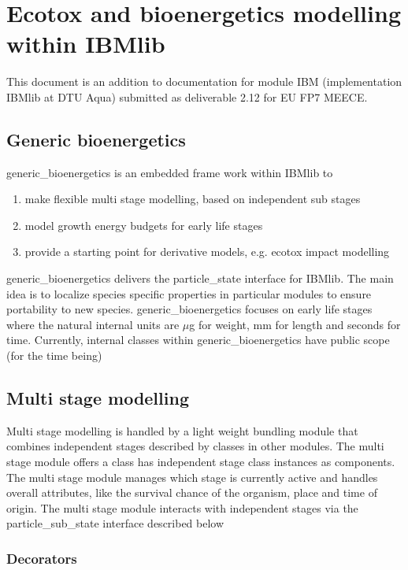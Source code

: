

\section{Ecotox and bioenergetics modelling within IBMlib} 

This document is an addition to documentation for module IBM (implementation IBMlib at DTU Aqua)
submitted as deliverable 2.12 for EU FP7 MEECE. 

\subsection{Generic bioenergetics} 

generic\_bioenergetics is an embedded frame work within IBMlib to 
\begin{enumerate}
  \item make flexible multi stage modelling, based on independent sub stages
  \item model growth energy budgets for early life stages
  \item provide a starting point for derivative models, e.g. ecotox impact modelling
\end{enumerate} 
generic\_bioenergetics delivers the particle\_state interface for IBMlib.
The main idea is to localize species specific properties in particular modules
to ensure portability to new species.
generic\_bioenergetics focuses on early life stages where the natural internal units 
are $\mu$g for weight, mm for length and seconds for time.
Currently, internal classes within generic\_bioenergetics have public scope (for the time being)

\subsection{Multi stage modelling} 

Multi stage modelling is handled by a light weight bundling module that 
combines independent stages described by classes in other modules. The multi stage module
offers a class has independent stage class instances as components. The multi stage module
manages which stage is currently active and handles overall attributes, like the survival chance
of the organism, place and time of origin. The multi stage module interacts with independent stages
via the particle\_sub\_state interface described below

\subsubsection{Decorators} 


